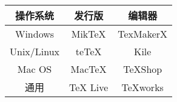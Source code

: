 \documentclass[UTF8]{ctexart}
\begin{document}
    \begin{tabular}{ccc}
        \hline
        操作系统 & 发行版 & 编辑器 \\
        \hline
        Windows & MikTeX & TexMakerX \\
        Unix/Linux & teTeX & Kile \\
        Mac OS & MacTeX & TeXShop \\
        通用 & TeX Live & TeXworks \\
        \hline
    \end{tabular}
\end{document}
